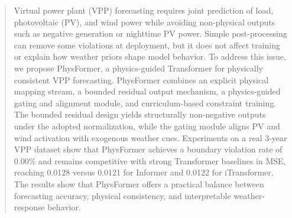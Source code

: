 \begin{abstract}
	Virtual power plant (VPP) forecasting requires joint prediction of load, photovoltaic (PV), and wind power while avoiding non-physical outputs such as negative generation or nighttime PV power. Simple post-processing can remove some violations at deployment, but it does not affect training or explain how weather priors shape model behavior. To address this issue, we propose PhysFormer, a physics-guided Transformer for physically consistent VPP forecasting. PhysFormer combines an explicit physical mapping stream, a bounded residual output mechanism, a physics-guided gating and alignment module, and curriculum-based constraint training. The bounded residual design yields structurally non-negative outputs under the adopted normalization, while the gating module aligns PV and wind activation with exogenous weather cues. Experiments on a real 3-year VPP dataset show that PhysFormer achieves a boundary violation rate of 0.00\% and remains competitive with strong Transformer baselines in MSE, reaching 0.0128 versus 0.0121 for Informer and 0.0122 for iTransformer. The results show that PhysFormer offers a practical balance between forecasting accuracy, physical consistency, and interpretable weather-response behavior.
\end{abstract}
